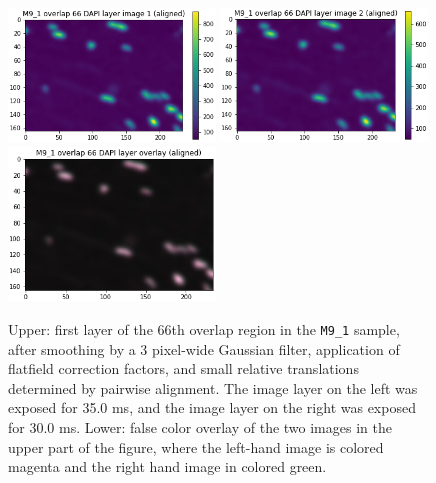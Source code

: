 \documentclass[letterpaper,11pt]{article}
\begin{document}
\begin{figure}[!ht]
\centering
\includegraphics[width=0.49\textwidth]{images/methods/smoothed_flatfielded_aligned_M9_1_overlap_66_dapi_image_1}
\includegraphics[width=0.49\textwidth]{images/methods/smoothed_flatfielded_aligned_M9_1_overlap_66_dapi_image_2}
\includegraphics[width=0.49\textwidth]{images/methods/smoothed_flatfielded_aligned_M9_1_overlap_66_dapi_overlay}
\caption{\footnotesize Upper: first layer of the 66th overlap region in the \texttt{M9\_1} sample, after smoothing by a 3 pixel-wide Gaussian filter, application of flatfield correction factors, and small relative translations determined by pairwise alignment. The image layer on the left was exposed for 35.0 ms, and the image layer on the right was exposed for 30.0 ms. Lower: false color overlay of the two images in the upper part of the figure, where the left-hand image is colored magenta and the right hand image in colored green.}
\label{fig:smoothed_flatfielded_aligned_M9_1_overlap_66}
\end{figure}
\end{document}
